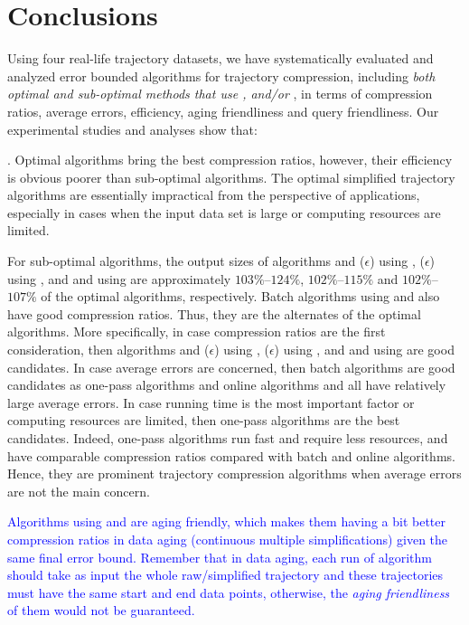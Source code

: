 \vspace{-1ex}
\section{Conclusions}

Using four real-life trajectory datasets, we have systematically evaluated and analyzed error bounded \lsa algorithms for trajectory compression, including \emph{both optimal and sub-optimal methods that use \ped, \sed and/or \dad},  in terms of compression ratios, average errors, efficiency, aging friendliness and query friendliness.
Our experimental studies and analyses show that:


. Optimal algorithms bring the best compression ratios, however, their efficiency is obvious poorer than sub-optimal algorithms. The optimal simplified trajectory algorithms are essentially impractical from the perspective of applications, especially in cases when the input data set is large or computing resources are limited.

For sub-optimal algorithms, the output sizes of algorithms \bqsa and \siped($\epsilon$) using \ped, \cised($\epsilon$) using \sed, and \tpa and \interval using \dad are approximately $103\%$--$124\%$, $102\%$--$115\%$ and $102\%$--$107\%$ of the optimal algorithms, respectively. Batch algorithms using \ped and \sed also have good compression ratios. Thus, they are the alternates of the optimal algorithms.
%
More specifically, in case compression ratios are the first consideration, then algorithms \bqsa and \siped($\epsilon$) using \ped, \cised($\epsilon$) using \sed, and \tpa and \interval using \dad are good candidates.
%
In case average errors are concerned, then batch algorithms are good candidates as one-pass algorithms and online algorithms \opwa and \bqsa all have relatively large average errors. %
%
In case running time is the most important factor or computing resources are limited, then one-pass algorithms are the best candidates.
%
Indeed, one-pass algorithms run fast and require less resources, and have comparable compression ratios compared with batch and online algorithms. Hence, they are prominent trajectory compression algorithms when average errors are not the main concern.

\textcolor{blue}{Algorithms \dpa using \ped and \sed are aging friendly, which makes them having a bit better compression ratios in data aging (continuous multiple simplifications) given the same final error bound. Remember that in data aging, each run of algorithm \dpa should take as input the whole raw/simplified trajectory and these trajectories must have the same start and end data points, otherwise, the \emph{aging friendliness} of them would not be guaranteed.}
 
